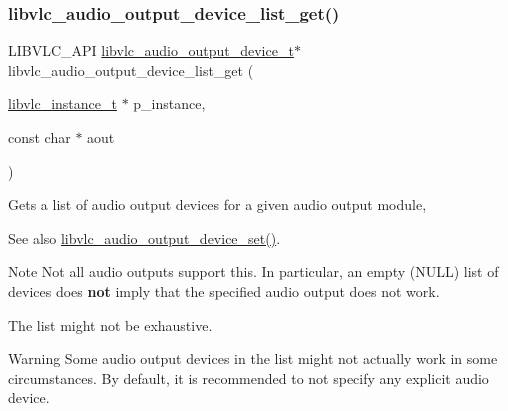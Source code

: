 \subsubsection{\texorpdfstring{libvlc\+\_\+audio\+\_\+output\+\_\+device\+\_\+list\+\_\+get()}{libvlc\_audio\_output\_device\_list\_get()}}
{\footnotesize\ttfamily L\+I\+B\+V\+L\+C\+\_\+\+A\+PI \hyperlink{structlibvlc__audio__output__device__t}{libvlc\+\_\+audio\+\_\+output\+\_\+device\+\_\+t}$\ast$ libvlc\+\_\+audio\+\_\+output\+\_\+device\+\_\+list\+\_\+get (\begin{DoxyParamCaption}\item[{\hyperlink{group__libvlc__core_ga316d739a80da4678206c79f4d6c2e284}{libvlc\+\_\+instance\+\_\+t} $\ast$}]{p\+\_\+instance,  }\item[{const char $\ast$}]{aout }\end{DoxyParamCaption})}

Gets a list of audio output devices for a given audio output module, \begin{DoxySeeAlso}{See also}
\hyperlink{group__libvlc__audio_ga4553bc34b90313e6592ad1af0067f31d}{libvlc\+\_\+audio\+\_\+output\+\_\+device\+\_\+set()}.
\end{DoxySeeAlso}
\begin{DoxyNote}{Note}
Not all audio outputs support this. In particular, an empty (N\+U\+LL) list of devices does {\bfseries not} imply that the specified audio output does not work.

The list might not be exhaustive.
\end{DoxyNote}
\begin{DoxyWarning}{Warning}
Some audio output devices in the list might not actually work in some circumstances. By default, it is recommended to not specify any explicit audio device.
\end{DoxyWarning}

